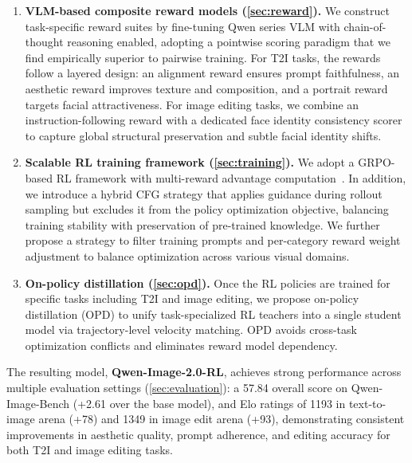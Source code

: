\documentclass{llmxive}
\begin{document}
\begin{enumerate}[leftmargin=*,itemsep=2pt]
    \item \textbf{VLM-based composite reward models (\cref{sec:reward}).} We construct task-specific reward suites by fine-tuning Qwen series VLM with chain-of-thought reasoning enabled, adopting a pointwise scoring paradigm that we find empirically superior to pairwise training. For T2I tasks, the rewards follow a layered design: an alignment reward ensures prompt faithfulness, an aesthetic reward improves texture and composition, and a portrait reward targets facial attractiveness. For image editing tasks, we combine an instruction-following reward with a dedicated face identity consistency scorer to capture global structural preservation and subtle facial identity shifts.

    \item \textbf{Scalable RL training framework (\cref{sec:training}).} We adopt a GRPO-based RL framework with multi-reward advantage computation~\citep{shao2024deepseekmath,liu2026gdpo}. In addition, we introduce a hybrid CFG strategy that applies guidance during rollout sampling but excludes it from the policy optimization objective, balancing training stability with preservation of pre-trained knowledge. We further propose a strategy to filter training prompts and per-category reward weight adjustment to balance optimization across various visual domains.

    \item \textbf{On-policy distillation (\cref{sec:opd}).} Once the RL policies are trained for specific tasks including T2I and image editing, we propose on-policy distillation (OPD) to unify task-specialized RL teachers into a single student model via trajectory-level velocity matching. OPD avoids cross-task optimization conflicts and eliminates reward model dependency.
\end{enumerate}

The resulting model, \textbf{Qwen-Image-2.0-RL}, achieves strong performance across multiple evaluation settings (\cref{sec:evaluation}): a 57.84 overall score on Qwen-Image-Bench (+2.61 over the base model), and Elo ratings of 1193 in text-to-image arena (+78) and 1349 in image edit arena (+93), demonstrating consistent improvements in aesthetic quality, prompt adherence, and editing accuracy for both T2I and image editing tasks.
\end{document}
